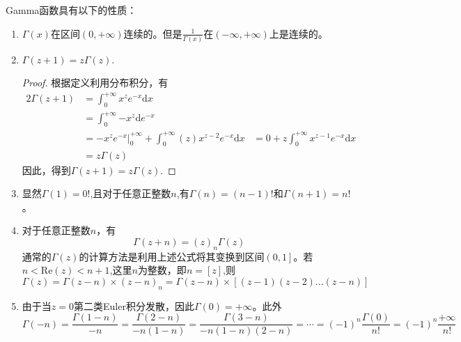 \begin{property}
	Gamma函数具有以下的性质：
	\begin{enumerate}[noitemsep]
		
		\item $\Gamma\left(x\right)$在区间$\left(0,+\infty\right)$连续的。但是$\displaystyle \frac{1}{\Gamma\left(x\right)}$在$\left(-\infty,+\infty\right)$上是连续的。
		
		\item $\Gamma\left(z+1\right) = z\Gamma\left(z\right).$
		\begin{proof}
			根据定义利用分布积分，有
			\begin{alignat*}{2}
			\Gamma\left(z+1\right) & = \int_{0}^{+\infty }{x^{z}e^{-x}\mathrm{d}x} \\
			& = \int_{0}^{+\infty }{-x^{z}\mathrm{d}e^{-x}} \\
			& = -x^{z}e^{-x}|_{0}^{+\infty} + \int_{0}^{+\infty}\left(z\right)x^{z-2}e^{-x}\mathrm{d}x
			& = 0 +z\int_{0}^{+\infty}x^{z-1}e^{-x}\mathrm{d}x \\
			& = z\Gamma\left(z\right)
			\end{alignat*}
			因此，得到$\Gamma\left(z+1\right) = z\Gamma\left(z\right).$
		\end{proof}
		
		\item 显然$\Gamma\left(1\right)=0!$,且对于任意正整数$n$,有$\Gamma\left(n\right)= \left(n-1\right)!$和$\Gamma\left(n+1\right)= n!$。 
		
		\item 对于任意正整数$n$，有
		$$\Gamma\left(z+n\right) = \left(z\right)_n\Gamma\left(z\right)$$
		通常的$\Gamma\left(z\right)$的计算方法是利用上述公式将其变换到区间$\left(0,1\right]$。若 $n<\mathrm{Re}\left(z\right)<n+1$,这里$n$为整数，即$n=\left[z \right]$,则
		$$
		\Gamma\left(z\right) = \Gamma\left(z-n\right) \times \left(z-n\right)_n = \Gamma\left(z-n\right) \times [\left(z-1\right)\left(z-2\right)...\left(z-n\right)]
		$$
		\item 由于当$z=0$第二类Euler积分发散，因此$\Gamma\left(0\right)=+\infty$。此外
		$$\Gamma\left(-n\right) = \frac{\Gamma\left(1-n\right)}{-n}= \frac{\Gamma\left(2-n\right)}{-n\left(1-n\right)} = \frac{\Gamma\left(3-n\right)}{-n\left(1-n\right)\left(2-n\right)} = \cdots = \left(-1\right)^n\frac{\Gamma\left(0\right)}{n!}= \left(-1\right)^n\frac{+\infty}{n!}$$
		

\end{enumerate}
\end{property}
